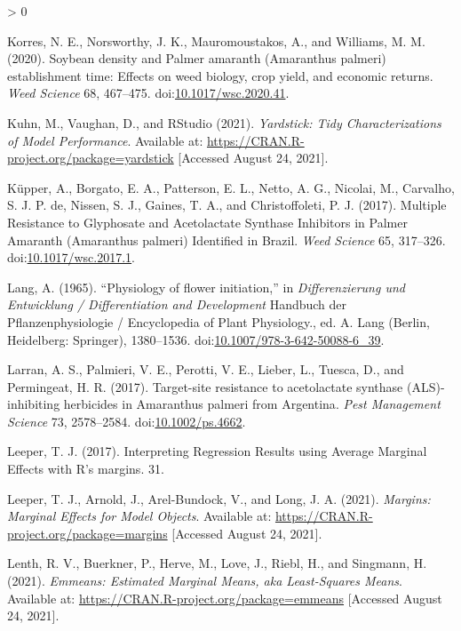 \documentclass[utf8]{frontiersSCNS}
\newlength{\cslhangindent}
\newenvironment{CSLReferences}[2] %
 {%
  \setlength{\parindent}{0pt}
  \ifodd #1 \everypar{\setlength{\hangindent}{\cslhangindent}}\ignorespaces\fi
  \ifnum #2 > 0
  \setlength{\parskip}{#2\baselineskip}
  \fi
 }%
 {}
\begin{document}
\begin{CSLReferences}{1}{0}
\leavevmode\hypertarget{ref-korres2020}{}%
Korres, N. E., Norsworthy, J. K., Mauromoustakos, A., and Williams, M.
M. (2020). Soybean density and {Palmer} amaranth ({Amaranthus} palmeri)
establishment time: Effects on weed biology, crop yield, and economic
returns. \emph{Weed Science} 68, 467--475.
doi:\href{https://doi.org/10.1017/wsc.2020.41}{10.1017/wsc.2020.41}.

\leavevmode\hypertarget{ref-kuhn2021}{}%
Kuhn, M., Vaughan, D., and RStudio (2021). \emph{Yardstick: {Tidy
Characterizations} of {Model Performance}}. Available at:
\url{https://CRAN.R-project.org/package=yardstick} {[}Accessed August
24, 2021{]}.

\leavevmode\hypertarget{ref-kupper2017}{}%
Küpper, A., Borgato, E. A., Patterson, E. L., Netto, A. G., Nicolai, M.,
Carvalho, S. J. P. de, Nissen, S. J., Gaines, T. A., and Christoffoleti,
P. J. (2017). Multiple {Resistance} to {Glyphosate} and {Acetolactate
Synthase Inhibitors} in {Palmer Amaranth} ({Amaranthus} palmeri)
{Identified} in {Brazil}. \emph{Weed Science} 65, 317--326.
doi:\href{https://doi.org/10.1017/wsc.2017.1}{10.1017/wsc.2017.1}.

\leavevmode\hypertarget{ref-lang1965}{}%
Lang, A. (1965). {``Physiology of flower initiation,''} in
\emph{Differenzierung und {Entwicklung} / {Differentiation} and
{Development}} Handbuch der {Pflanzenphysiologie} / {Encyclopedia} of
{Plant Physiology}., ed. A. Lang ({Berlin, Heidelberg}: {Springer}),
1380--1536.
doi:\href{https://doi.org/10.1007/978-3-642-50088-6_39}{10.1007/978-3-642-50088-6\_39}.

\leavevmode\hypertarget{ref-larran2017}{}%
Larran, A. S., Palmieri, V. E., Perotti, V. E., Lieber, L., Tuesca, D.,
and Permingeat, H. R. (2017). Target-site resistance to acetolactate
synthase ({ALS})-inhibiting herbicides in {Amaranthus} palmeri from
{Argentina}. \emph{Pest Management Science} 73, 2578--2584.
doi:\href{https://doi.org/10.1002/ps.4662}{10.1002/ps.4662}.

\leavevmode\hypertarget{ref-leeper2017}{}%
Leeper, T. J. (2017). Interpreting {Regression Results} using {Average
Marginal Eﬀects} with {R}'s margins. 31.

\leavevmode\hypertarget{ref-leeper2021}{}%
Leeper, T. J., Arnold, J., Arel-Bundock, V., and Long, J. A. (2021).
\emph{Margins: {Marginal Effects} for {Model Objects}}. Available at:
\url{https://CRAN.R-project.org/package=margins} {[}Accessed August 24,
2021{]}.

\leavevmode\hypertarget{ref-lenth2021}{}%
Lenth, R. V., Buerkner, P., Herve, M., Love, J., Riebl, H., and
Singmann, H. (2021). \emph{Emmeans: {Estimated Marginal Means}, aka
{Least}-{Squares Means}}. Available at:
\url{https://CRAN.R-project.org/package=emmeans} {[}Accessed August 24,
2021{]}.


\end{CSLReferences}
\end{document}
